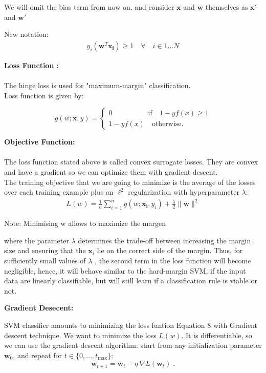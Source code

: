 \documentclass[11pt]{article}
\begin{document}
We will omit the bias term from now on, and consider $\mathbf{x}$ and $\mathbf{w}$ themselves as $\mathbf{x}'$ and $\mathbf{w}'$

New notation: 
\begin{align}
    y_i(\mathbf{w}^T \mathbf{x_i} )\geq 1 \quad \forall \quad i \in 1...N    
\end{align}

\textbf{Loss Function :} \\
\\The hinge loss is used for "maximum-margin" classification.\\
Loss function is given by:

\begin{equation}
 g(w;\mathbf{x}, y) =
\begin{cases}
0 \quad \quad \quad \quad\quad \text{if}\quad 1-yf(x) \geq 1 \\ 1-yf(x) \quad\text{otherwise.}
\end{cases}
\end{equation}


\textbf{Objective Function:}\\
 \\The loss function stated above is called convex surrogate losses. They are convex and have a gradient so we can optimize them with gradient descent.\\
 
The training objective that we are going to minimize is the average of the losses over each training example plus an $\ell^2$ regularization with hyperparameter $\lambda$:
\begin{align}
 L(w) = \frac{1}{n}\sum_{i=1}^n g(w;\mathbf{x_i}, y_i)  + \frac{\lambda}{2} \| \mathbf{w}\|^2   
\end{align}

Note:  Minimising w allows to maximize the margen

where the parameter $\lambda$  determines the trade-off between increasing the margin size and ensuring that the $\mathbf {x} _{i}$ lie on the correct side of the margin. Thus, for sufficiently small values of $\lambda$ , the second term in the loss function will become negligible, hence, it will behave similar to the hard-margin SVM, if the input data are linearly classifiable, but will still learn if a classification rule is viable or not.

\textbf{Gradient Desecent:}  

SVM classifier amounts to minimizing the loss funtion Equation 8 with Gradient descent technique.
We want to minimize the loss $L(w)$. It is differentiable, so we can use the gradient descent algorithm: start from any initialization parameter $\mathbf{w}_0$, and repeat for $t\in\{0, \dots, t_{\max} \}$:
$$\mathbf{w}_{t+1} = \mathbf{w}_t - \eta\ \nabla L (\mathbf{w}_t) \; .$$
\end{document}
